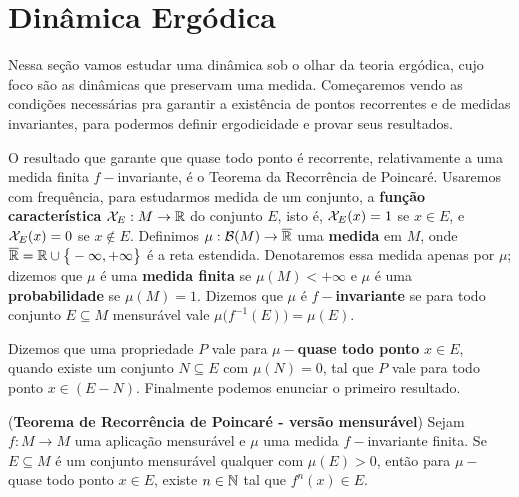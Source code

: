 \section{Dinâmica Ergódica}

Nessa seção vamos estudar uma dinâmica sob o olhar da teoria ergódica, cujo foco são as dinâmicas que preservam uma medida. Começaremos vendo as condições necessárias pra garantir a existência de pontos recorrentes e de medidas invariantes, para podermos definir ergodicidade e provar seus resultados.

O resultado que garante que quase todo ponto é recorrente, relativamente a uma medida finita $f-$invariante, é o Teorema da Recorrência de Poincaré. Usaremos com frequência, para estudarmos medida de um conjunto, a \textbf{função característica} $\mathcal{X}_{E}:M\to \mathbb{R}$ do conjunto $E$, isto é, $\mathcal{X}_{E}(x)=1$ se $x\in E$, e $\mathcal{X}_{E}(x)=0$ se $x\notin E$. Definimos $\mu:\mathcal{B}(M)\to\overline{\mathbb{R}}$ uma \textbf{medida} em $M$, onde $\overline{\mathbb{R}}=\mathbb{R}\cup\big\{-\infty,+\infty\big\}$ é a reta estendida. Denotaremos essa medida apenas por $\mu$; dizemos que $\mu$ é uma \textbf{medida finita} se $\mu(M)<+\infty$ e $\mu$ é uma \textbf{probabilidade} se $\mu(M)=1$. Dizemos que $\mu$ é \textbf{$f-$invariante} se para todo conjunto $E\subseteq M$ mensurável vale $\mu\big(f^{-1}(E)\big)=\mu(E)$.

Dizemos que uma propriedade $P$ vale para \textbf{$\mu-$quase todo ponto} $x\in E$, quando existe um conjunto $N\subseteq E$ com $\mu(N)=0$, tal que $P$ vale para todo ponto $x\in (E-N)$. Finalmente podemos enunciar o primeiro resultado.

\begin{teorema}\label{trp_vm} (\textbf{Teorema de Recorrência de Poincaré - versão mensurável}) Sejam $f:M\to M$ uma aplicação mensurável e $\mu$ uma medida $f-$invariante finita. Se $E\subseteq M$ é um conjunto mensurável qualquer com $\mu(E)>0$, então para $\mu-$quase todo ponto $x\in E$, existe $n\in\mathbb{N}$ tal que $f^n(x)\in E$.
\end{teorema}

